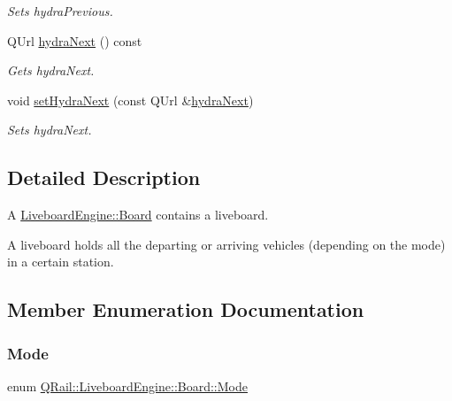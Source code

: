 \begin{DoxyCompactItemize}
\begin{DoxyCompactList}\small\item\em Sets hydra\+Previous. \end{DoxyCompactList}\item 
Q\+Url \mbox{\hyperlink{classQRail_1_1LiveboardEngine_1_1Board_a0ed5cfc1cc0b6584bf087f936f60dcab}{hydra\+Next}} () const
\begin{DoxyCompactList}\small\item\em Gets hydra\+Next. \end{DoxyCompactList}\item 
void \mbox{\hyperlink{classQRail_1_1LiveboardEngine_1_1Board_a01f417e63bf4071ffec42bab89c4a433}{set\+Hydra\+Next}} (const Q\+Url \&\mbox{\hyperlink{classQRail_1_1LiveboardEngine_1_1Board_a0ed5cfc1cc0b6584bf087f936f60dcab}{hydra\+Next}})
\begin{DoxyCompactList}\small\item\em Sets hydra\+Next. \end{DoxyCompactList}\end{DoxyCompactItemize}


\subsection{Detailed Description}
A \mbox{\hyperlink{classQRail_1_1LiveboardEngine_1_1Board}{Liveboard\+Engine\+::\+Board}} contains a liveboard. 

A liveboard holds all the departing or arriving vehicles (depending on the mode) in a certain station. 

\subsection{Member Enumeration Documentation}
\mbox{\label{classQRail_1_1LiveboardEngine_1_1Board_a0ab6d318f405895f62c6e98cb2d86c6e}} 
\subsubsection{\texorpdfstring{Mode}{Mode}}
{\footnotesize\ttfamily enum \mbox{\hyperlink{classQRail_1_1LiveboardEngine_1_1Board_a0ab6d318f405895f62c6e98cb2d86c6e}{Q\+Rail\+::\+Liveboard\+Engine\+::\+Board\+::\+Mode}}\hspace{0.3cm}{\ttfamily [strong]}}



